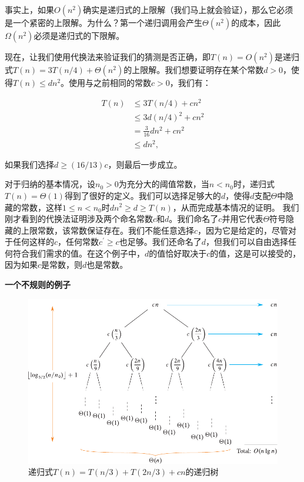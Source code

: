 \documentclass[lang=cn,newtx,10pt,scheme=chinese]{elegantbook}
\begin{document}
事实上，如果$O\left(n^2\right)$确实是递归式的上限解（我们马上就会验证），那么它必须是一个紧密的上限解。为什么？第一个递归调用会产生$\Theta\left(n^2\right)$的成本，因此$\Omega\left(n^2\right)$必须是递归式的下限解。

现在，让我们使用代换法来验证我们的猜测是否正确，即$T(n)=O\left(n^2\right)$是递归式$T(n)=3 T(n / 4)+\Theta\left(n^2\right)$的上限解。我们想要证明存在某个常数$d>0$，使得$T(n) \leq d n^2$。使用与之前相同的常数$c>0$，我们有：

$$
\begin{aligned}
T(n) & \leq 3 T(n / 4)+c n^2 \\
& \leq 3 d(n / 4)^2+c n^2 \\
& =\frac{3}{16} d n^2+c n^2 \\
& \leq d n^2,
\end{aligned}
$$

如果我们选择$d \geq(16 / 13) c$，则最后一步成立。

对于归纳的基本情况，设$n_0>0$为充分大的阈值常数，当$n<n_0$时，递归式$T(n)=\Theta(1)$得到了很好的定义。我们可以选择足够大的$d$，使得$d$支配$\Theta$中隐藏的常数，这样$1 \leq n<n_0$时$d n^2 \geq d \geq T(n)$，从而完成基本情况的证明。
我们刚才看到的代换法证明涉及两个命名常数$c$和$d$。我们命名了$c$并用它代表$\Theta$符号隐藏的上限常数，该常数保证存在。我们不能任意选择$c$，因为它是给定的，尽管对于任何这样的$c$，任何常数$c^{\prime} \geq c$也足够。我们还命名了$d$，但我们可以自由选择任何符合我们需求的值。在这个例子中，$d$的值恰好取决于$c$的值，这是可以接受的，因为如果$c$是常数，则$d$也是常数。

\textbf{一个不规则的例子}

\begin{figure}
    \centering
    \includegraphics{算法导论第四版插图/第四章/4-2.pdf}
    \caption{递归式$T(n)=T(n / 3)+T(2 n / 3)+c n$的递归树}
    \label{fig:4-2}
\end{figure}
\end{document}
